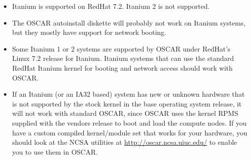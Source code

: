 \begin{itemize}
  
\item Itanium is supported on RedHat 7.2.  Itanium 2 is not supported.
  
\item The OSCAR autoinstall diskette will probably not work on Itanium
  systems, but they mostly have support for network booting.
  
\item Some Itanium 1 or 2 systems are supported by OSCAR under
  RedHat's Linux 7.2 release for Itanium.  Itanium systems that can
  use the standard RedHat Itanium kernel for booting and network
  access should work with OSCAR.
  
\item If an Itanium (or an IA32 based) system has new or unknown
  hardware that is not supported by the stock kernel in the base
  operating system release, it will not work with standard OSCAR,
  since OSCAR uses the kernel RPMS supplied with the vendors release
  to boot and load the compute nodes.  If you have a custom compiled
  kernel/module set that works for your hardware, you should look at
  the NCSA utilities at \url{http://oscar.ncsa.uiuc.edu/} to
  enable you to use them in OSCAR.
\end{itemize}





